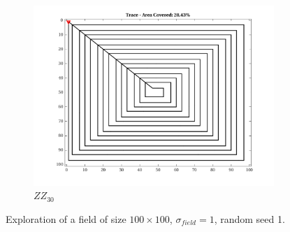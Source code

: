 \begin{figure}[htb!]
    \begin{subfigure}[t]{0.25\textwidth}
        \centering
        \includegraphics[width=\linewidth]{figures/path_zz_30p_100x100_sf_1_seed_1.png}
        \captionsetup{skip=0.20\baselineskip,size=footnotesize}
        \caption{$ZZ_{30}$}
    \end{subfigure}%
    \captionsetup{skip=0.20\baselineskip}
    \caption{Exploration of a field of size $100 \times 100$, $\sigma_{field} = 1$, random seed 1.}
    \label{fig:sf1}
\end{figure}


